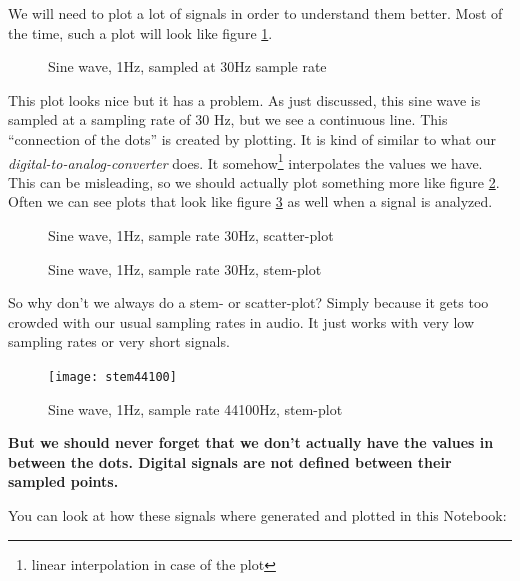 We will need to plot a lot of signals in order to understand them better. Most of the time, such a plot will look like figure \ref{fig:simpeSine}.

\begin{figure}[h!]
	\centering
	
	\caption[simple sine plot]
	{Sine wave, 1Hz, sampled at 30Hz sample rate}
	\label{fig:simpeSine}
\end{figure}

This plot looks nice but it has a problem. As just discussed, this sine wave is sampled at a sampling rate of 30 Hz, but we see a continuous line. This ``connection of the dots'' is created by plotting. It is kind of similar to what our \textit{digital-to-analog-converter} does. It somehow\footnote{linear interpolation in case of the plot} interpolates the values we have. \\
This can be misleading, so we should actually plot something more like figure \ref{fig:scatter}. Often we can see plots that look like figure \ref{fig:stem} as well when a signal is analyzed.

\begin{figure}[H]
	\centering
	
	\caption[Sine scatter-plot]
	{Sine wave, 1Hz, sample rate 30Hz, scatter-plot}
	\label{fig:scatter}
\end{figure}



\begin{figure}[H]
	\centering
	
	\caption[sine stem plot]
	{Sine wave, 1Hz, sample rate 30Hz, stem-plot}
	\label{fig:stem}
\end{figure}


So why don't we always do a stem- or scatter-plot? Simply because it gets too crowded with our usual sampling rates in audio. It just works with very low sampling rates or very short signals.\\
\begin{figure}[H]
	\centering
	\texttt{[image: stem44100]}
	\caption[sine stem plot, crowded]
	{Sine wave, 1Hz, sample rate 44100Hz, stem-plot}
	\label{fig:sine1HzStemPlot}
\end{figure}
\textbf{But we should never forget that we don't actually have the values in between the dots. Digital signals are not defined between their sampled points.}

You can look at how these signals where generated and plotted in this Notebook:

